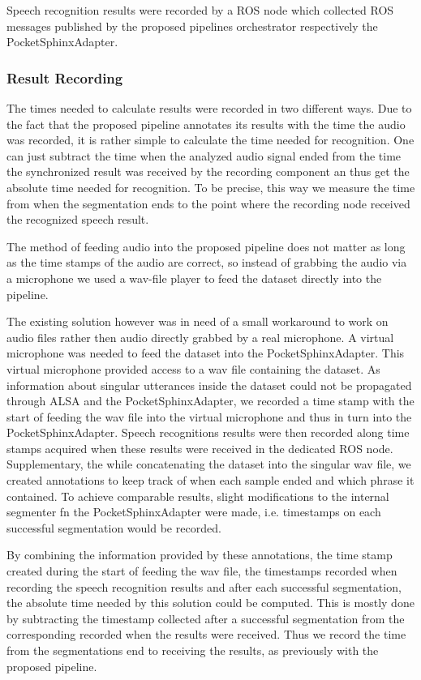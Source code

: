 Speech recognition results were recorded by a ROS node which collected ROS messages published by the proposed pipelines orchestrator respectively the PocketSphinxAdapter.

\subsubsection{Result Recording}

The times needed to calculate results were recorded in two different ways.
Due to the fact that the proposed pipeline annotates its results with the time the audio was recorded, it is rather simple to calculate the time needed for recognition.
One can just subtract the time when the analyzed audio signal ended from the time the synchronized result was received by the recording component an thus get the absolute time needed for recognition.
To be precise, this way we measure the time from when the segmentation ends to the point where the recording node received the recognized speech result.

The method of feeding audio into the proposed pipeline does not matter as long as the time stamps of the audio are correct, so instead of grabbing the audio via a microphone we used a wav-file player to feed the dataset directly into the pipeline.

The existing solution however was in need of a small workaround to work on audio files rather then audio directly grabbed by a real microphone.
A virtual microphone was needed to feed the dataset into the PocketSphinxAdapter.
This virtual microphone provided access to a wav file containing the dataset. 
As information about singular utterances inside the dataset could not be propagated through ALSA and the PocketSphinxAdapter, we recorded a time stamp with the start of feeding the wav file into the virtual microphone and thus in turn into the PocketSphinxAdapter.
Speech recognitions results were then recorded along time stamps acquired when these results were received in the dedicated ROS node.
Supplementary, the while concatenating the dataset into the singular wav file, we created annotations to keep track of when each sample ended and which phrase it contained.
To achieve comparable results, slight modifications to the internal segmenter fn the PocketSphinxAdapter were made, i.e. timestamps on each successful segmentation would be recorded.

By combining the information provided by these annotations, the time stamp created during the start of feeding the wav file, the timestamps recorded when recording the speech recognition results and after each successful segmentation, the absolute time needed by this solution could be computed.
This is mostly done by subtracting the timestamp collected after a successful segmentation from the corresponding recorded when the results were received.
Thus we record the time from the segmentations end to receiving the results, as previously with the proposed pipeline.

